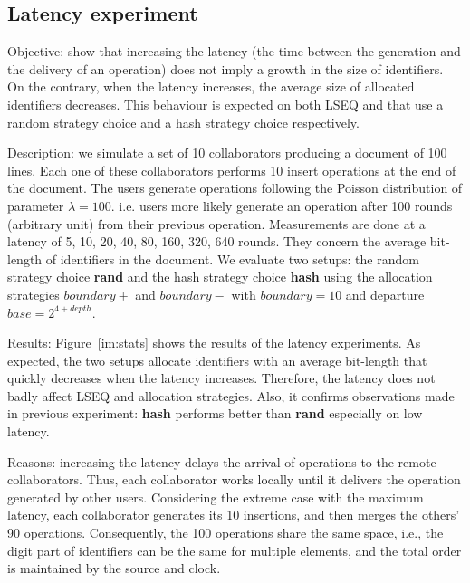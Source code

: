 \subsection{Latency experiment}
\begin{asparadesc}
\item[Objective:] show that increasing the latency (the time between the
  generation and the delivery of an operation) does not imply a growth in the
  size of identifiers. On the contrary, when the latency increases, the average
  size of allocated identifiers decreases. This behaviour is expected on both
  LSEQ and \NAME{} that use a random strategy choice and a hash strategy choice
  respectively.
\item[Description:] we simulate a set of 10 collaborators producing a document
  of 100 lines. Each one of these collaborators performs 10 insert operations
  at the end of the document. The users generate operations following the
  Poisson distribution of parameter $\lambda=100$. i.e. users more likely
  generate an operation after 100 rounds (arbitrary unit) from their previous
  operation. Measurements are done at a latency of 5, 10, 20, 40, 80, 160, 320,
  640 rounds. They concern the average bit-length of identifiers in the
  document.  We evaluate two setups: the random strategy choice \textbf{rand}
  and the hash strategy choice \textbf{hash} using the allocation strategies
  $boundary+$ and $boundary-$ with $boundary=10$ and departure
  $base=2^{4+depth}$.
\item[Results:] Figure~\ref{im:stats} shows the results of the latency
  experiments. As expected, the two setups allocate identifiers with an average
  bit-length that quickly decreases when the latency increases. Therefore, the
  latency does not badly affect LSEQ and \NAME{} allocation strategies. Also,
  it confirms observations made in previous experiment: \textbf{hash} performs
  better than \textbf{rand} especially on low latency.
\item[Reasons:] increasing the latency delays the arrival of operations to the
  remote collaborators. Thus, each collaborator works locally until it delivers
  the operation generated by other users. Considering the extreme case with the
  maximum latency, each collaborator generates its 10 insertions, and then
  merges the others' 90 operations. Consequently, the 100 operations share the
  same space, i.e., the digit part of identifiers can be the same for multiple
  elements, and the total order is maintained by the source and clock.
\end{asparadesc}


